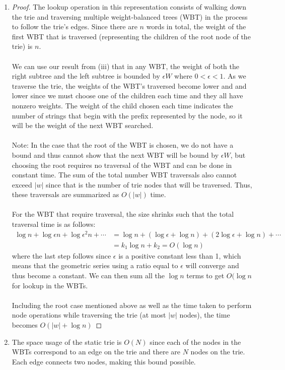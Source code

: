 \documentclass{article}
\theoremstyle{casestyle}
\begin{document}
\begin{enumerate}[i]
\item \begin{proof}{}
The lookup operation in this representation consists of walking down the trie and traversing multiple weight-balanced trees (WBT) in the process to follow the trie's edges. Since there are $n$ words in total, the weight of the first WBT that is traversed (representing the children of the root node of the trie) is $n$.\\\\
We can use our result from (iii) that in any WBT, the weight of both the right subtree and the left subtree is bounded by $\epsilon W$ where $0<\epsilon<1$. As we traverse the trie, the weights of the WBT's traversed become lower and and lower since we must choose one of the children each time and they all have nonzero weights. The weight of the child chosen each time indicates the number of strings that begin with the prefix represented by the node, so it will be the weight of the next WBT searched.\\\\ Note: In the case that the root of the WBT is chosen, we do not have a bound and thus cannot show that the next WBT will be bound by $\epsilon W$, but choosing the root requires no traversal of the WBT and can be done in constant time. The sum of the total number WBT traversals also cannot exceed $\left|w\right|$ since that is the number of trie nodes that will be traversed. Thus, these traversals are summarized as $O(\left|w\right|)$ time.\\\\ For the WBT that require traversal, the size shrinks such that the total traversal time is as follows: 
\begin{align*}
  \log{n} + \log{\epsilon n} + \log{\epsilon^2 n} + \cdots
&= \log{n} + (\log\epsilon + \log n) + (2\log\epsilon + \log n) + \cdots \\
&= k_1\log n + k_2 = O(\log n)
\end{align*}
where the last step follows since $\epsilon$ is a positive constant less than 1, which means that the geometric series using a ratio equal to $\epsilon$ will converge and thus become a constant. We can then sum all the $\log n$ terms to get $O(\log n$ for lookup in the WBTs.\\\\ Including the root case mentioned above as well as the time taken to perform node operations while traversing the trie (at most $\left|w\right|$ nodes), the time becomes $O(\left|w\right| + \log n)$
\end{proof}
\item The space usage of the static trie is $O(N)$ since each of the nodes in the WBTs correspond to an edge on the trie and there are $N$ nodes on the trie. Each edge connects two nodes, making this bound possible. 
\end{enumerate}
\end{document}
